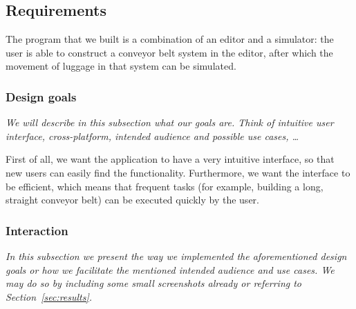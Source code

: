 \subsection{Requirements}
The program that we built is a combination of an editor and a simulator: the user is able to construct a conveyor belt system in the editor, after which the movement of luggage in that system can be simulated.

\subsubsection{Design goals}
\textit{We will describe in this subsection what our goals are. Think of intuitive user interface, cross-platform, intended audience and possible use cases, \ldots}

First of all, we want the application to have a very intuitive interface, so that new users can easily find the functionality. Furthermore, we want the interface to be efficient, which means that frequent tasks (for example, building a long, straight conveyor belt) can be executed quickly by the user.

\subsubsection{Interaction}
\textit{In this subsection we present the way we implemented the aforementioned design goals or how we facilitate the mentioned intended audience and use cases. We may do so by including some small screenshots already or referring to Section~\ref{sec:results}.}